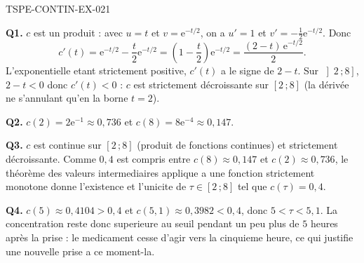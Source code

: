 \begin{corrige}{TSPE-CONTIN-EX-021}

\textbf{Q1.} $c$ est un produit : avec $u = t$ et $v = \mathrm{e}^{-t/2}$, on a $u' = 1$ et $v' = -\tfrac{1}{2}\mathrm{e}^{-t/2}$. Donc
\[ c'(t) = \mathrm{e}^{-t/2} - \frac{t}{2}\mathrm{e}^{-t/2} = \left(1 - \frac{t}{2}\right)\mathrm{e}^{-t/2} = \frac{(2-t)\,\mathrm{e}^{-t/2}}{2}. \]
L'exponentielle etant strictement positive, $c'(t)$ a le signe de $2-t$. Sur $\left]2\,;8\right]$, $2-t < 0$ donc $c'(t) < 0$ : $c$ est strictement décroissante sur $[2\,;8]$ (la dérivée ne s'annulant qu'en la borne $t=2$).

\textbf{Q2.} $c(2) = 2\mathrm{e}^{-1} \approx 0{,}736$ et $c(8) = 8\mathrm{e}^{-4} \approx 0{,}147$.

\textbf{Q3.} $c$ est continue sur $[2\,;8]$ (produit de fonctions continues) et strictement décroissante. Comme $0{,}4$ est compris entre $c(8) \approx 0{,}147$ et $c(2) \approx 0{,}736$, le théorème des valeurs intermediaires applique a une fonction strictement monotone donne l'existence et l'unicite de $\tau \in [2\,;8]$ tel que $c(\tau) = 0{,}4$.

\textbf{Q4.} $c(5) \approx 0{,}4104 > 0{,}4$ et $c(5{,}1) \approx 0{,}3982 < 0{,}4$, donc $5 < \tau < 5{,}1$. La concentration reste donc superieure au seuil pendant un peu plus de $5$ heures après la prise : le medicament cesse d'agir vers la cinquieme heure, ce qui justifie une nouvelle prise a ce moment-la.
\end{corrige}
